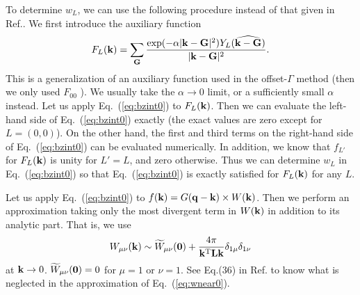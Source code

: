 \documentclass[a4paper,10pt,epsf,fleqn]{article}
\newcommand{\bfzero}{{\bf 0}}
\newcommand{\bfq}{{\bf q}}
\newcommand{\bfk}{{\bf k}}
\newcommand{\bfG}{{\bf G}}
\newcommand{\req}[1]{\mbox{Eq.~(\ref{#1})}}
\begin{document}
To determine $w_L$, 
we can use the following procedure instead of that given 
in Ref.\cite{freysoldt_dielectric_2007}.
We first introduce the auxiliary function  
\begin{eqnarray}
F_L(\bfk) =\sum_{\bfG} \frac{\exp(- \alpha
 |\bfk-\bfG|^2)Y_L(\widehat{\bfk-\bfG})}{|\bfk-\bfG|^2}.
\end{eqnarray}
This is a generalization of an auxiliary function used in the 
offset-$\Gamma$ method (then we only used $F_{00}$ \cite{kotani_quasiparticle_2007}).
We usually take the $\alpha \to 0$ limit, or a sufficiently small $\alpha$ instead.
Let us apply \req{eq:bzint0} to $F_L(\bfk)$.
Then we can evaluate the left-hand side of \req{eq:bzint0}
exactly (the exact values are zero except for $L=(0,0)$). 
On the other hand, the first and 
third terms on the right-hand side of \req{eq:bzint0}
can be evaluated numerically.
In addition, we know that $f_{L'}$ for $F_L(\bfk)$ is unity for $L'=L$,
and zero otherwise.
Thus we can determine $w_L$ in \req{eq:bzint0}
so that \req{eq:bzint0} is exactly satisfied for $F_L(\bfk)$ for any $L$.


Let us apply \req{eq:bzint0} to $f(\bfk)=G(\bfq-\bfk) \times W(\bfk)$.
Then we perform an approximation taking only the most divergent term 
in $W(\bfk)$ in addition to its analytic part. That is, we use
\begin{eqnarray}
W_{\mu \nu}(\bfk) \sim \widetilde{W}_{\mu \nu}(\bfzero) +
 \frac{4 \pi}{\bfk^{\rm T} {\bf L} \bfk}
 \delta_{1\mu}\delta_{1\nu}
\label{eq:wnear0}
\end{eqnarray}
at $\bfk \to 0$. 
$\widetilde{W}_{\mu \nu}(\bfzero)=0$ for $\mu=1$ or $\nu=1$. 
See Eq.(36) in Ref.\cite{friedrich_efficient_2010} to know what is
neglected in the approximation of \req{eq:wnear0}.
\end{document}
